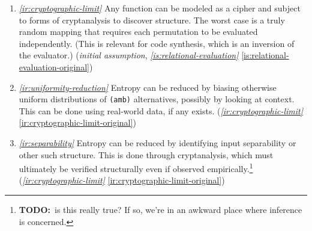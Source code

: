 \documentclass{report}
\makeatletter
\newcommand*{\Label}[2]{%
  \@bsphack
  \begingroup
    \label{#1-original}%
    \def\@currentlabel{#2}%
    \label{#1}%
  \endgroup
  \@esphack
}
\newcommand{\initial}{{\em initial assumption}}
\newcommand{\refboth}[1]{{\em \ref{#1}} \ref{#1-original}}
\makeatother
\begin{document}
\begin{enumerate}
\item{}\Label{ir:cryptographic-limit}{xhr.cryptographic}{\em\ref{ir:cryptographic-limit}}
  Any function can be modeled as a cipher and subject to forms of
  cryptanalysis to discover structure. The worst case is a truly random
  mapping that requires each permutation to be evaluated independently.
  (This is relevant for code synthesis, which is an inversion of the
  evaluator.)
(\initial, \refboth{is:relational-evaluation})
\item{}\Label{ir:uniformity-reduction}{xhr.uniformityreduction}{\em\ref{ir:uniformity-reduction}}
  Entropy can be reduced by biasing otherwise uniform distributions of
  \verb|(amb)| alternatives, possibly by looking at context. This can be
  done using real-world data, if any exists.
(\refboth{ir:cryptographic-limit})
\item{}\Label{ir:separability}{xhr.separability}{\em\ref{ir:separability}}
  Entropy can be reduced by identifying input separability or other such
  structure. This is done through cryptanalysis, which must ultimately be
  verified structurally even if observed empirically.\footnote{{\bf
  TODO:}~is this really true? If so, we're in an awkward place where
  inference is concerned.}
(\refboth{ir:cryptographic-limit})
\end{enumerate}
\end{document}
